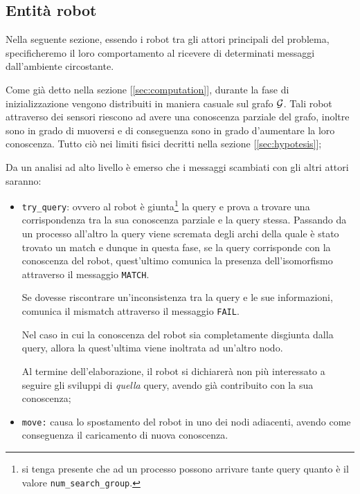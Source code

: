 \documentclass{llncs}
\begin{document}
\subsection{Entità robot}
Nella seguente sezione, essendo i robot tra gli attori principali
del problema, specificheremo il loro comportamento
al ricevere di determinati messaggi dall'ambiente circostante.

Come già detto nella sezione [\ref{sec:computation}],
durante la fase di inizializzazione vengono distribuiti
in maniera casuale sul grafo $\mathcal{G}$. Tali robot
attraverso dei sensori riescono ad avere una conoscenza parziale
del grafo, inoltre sono in grado di muoversi e di conseguenza
sono in grado d'aumentare la loro conoscenza. Tutto ciò nei limiti
fisici decritti nella sezione [\ref{sec:hypotesis}];

Da un analisi ad alto livello è emerso che i messaggi scambiati con
gli altri attori saranno:
\begin{itemize}
	\item \texttt{try\_query}: ovvero al robot è giunta\footnote{si
	tenga presente che ad un processo possono arrivare tante query
	quanto è il valore \texttt{num\_search\_group}.} la query e prova
	a trovare una corrispondenza tra la sua conoscenza parziale e
	la query stessa. Passando da un processo all'altro la query
	viene scremata degli archi della quale è stato trovato un match
	e dunque in questa fase, se la query corrisponde con la conoscenza
	del robot, quest'ultimo comunica la presenza dell'isomorfismo attraverso
	il messaggio \texttt{MATCH}.
	
	Se dovesse riscontrare un'inconsistenza tra la query e
	le sue informazioni, comunica il mismatch attraverso
	il messaggio \texttt{FAIL}.
	
	Nel caso in cui la conoscenza del robot sia completamente disgiunta
	dalla query, allora la quest'ultima viene inoltrata ad un'altro nodo.
	
	Al termine dell'elaborazione, il robot si dichiarerà non più interessato
	a seguire gli sviluppi di \emph{quella} query, avendo già contribuito con la
	sua conoscenza;
	\item \texttt{move:} causa lo spostamento del robot in uno dei
	nodi adiacenti, avendo come conseguenza il caricamento
	di nuova conoscenza.
\end{itemize}
\end{document}

